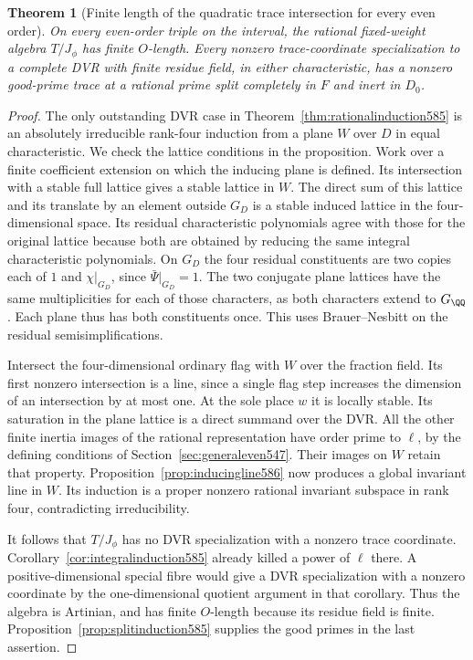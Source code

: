 \documentclass[a4paper,11pt]{article}
\newtheorem{theorem}[proposition]{Theorem}
\theoremstyle{definition}
\theoremstyle{remark}
\numberwithin{equation}{section}
\begin{document}
\begin{theorem}[Finite length of the quadratic trace intersection for every even order]
\leavevmode\label{thm:allinduction586}
On every even-order triple on the interval, the rational
fixed-weight algebra \(T/J_\phi\) has finite \(O\)-length.
Every nonzero trace-coordinate specialization to a complete
DVR with finite residue field, in either characteristic,
has a nonzero good-prime trace at a rational prime split
completely in \(F\) and inert in \(D_0\).
\end{theorem}
\begin{proof}
The only outstanding DVR case in
Theorem~\ref{thm:rationalinduction585} is an absolutely
irreducible rank-four induction from a plane \(W\) over \(D\)
in equal characteristic. We check the lattice conditions in
the proposition. Work over a finite coefficient extension
on which the inducing plane is defined. Its intersection
with a stable full lattice gives a stable lattice in \(W\).
The direct sum of this lattice and its translate by an
element outside \(G_D\) is a stable induced lattice in the
four-dimensional space. Its residual characteristic
polynomials agree with those for the original lattice because
both are obtained by reducing the same integral characteristic
polynomials. On \(G_D\) the four residual constituents are
two copies each of \(1\) and \(\chi|_{G_D}\), since
\(\bar\Psi|_{G_D}=1\). The two conjugate plane lattices
have the same multiplicities for each of those characters,
as both characters extend to \(G_\QQ\). Each plane thus has
both constituents once. This uses Brauer--Nesbitt on the
residual semisimplifications.

Intersect the four-dimensional ordinary flag with \(W\)
over the fraction field. Its first nonzero intersection
is a line, since a single flag step increases the dimension
of an intersection by at most one. At the sole place \(w\)
it is locally stable. Its saturation in the plane lattice
is a direct summand over the DVR. All the other finite inertia
images of the rational representation have order prime to
\(\ell\), by the defining conditions of
Section~\ref{sec:generaleven547}. Their images on \(W\) retain
that property. Proposition~\ref{prop:inducingline586} now produces
a global invariant line in \(W\). Its induction is a proper
nonzero rational invariant subspace in rank four, contradicting
irreducibility.

It follows that \(T/J_\phi\) has no DVR specialization with a
nonzero trace coordinate. Corollary~\ref{cor:integralinduction585}
already killed a power of \(\ell\) there. A positive-dimensional
special fibre would give a DVR specialization with a nonzero
coordinate by the one-dimensional quotient argument in that
corollary. Thus the algebra is Artinian, and has finite
\(O\)-length because its residue field is finite.
Proposition~\ref{prop:splitinduction585} supplies the good
primes in the last assertion.
\end{proof}
\end{document}
